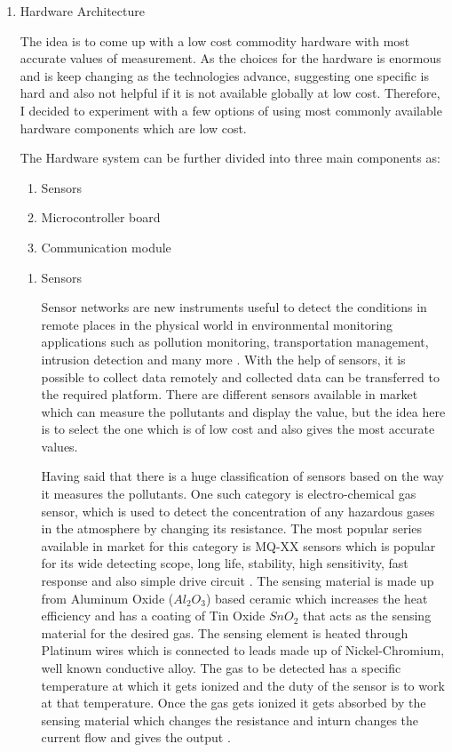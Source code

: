 \documentclass[11pt]{article}
\begin{document}
\begin{enumerate}

\item {Hardware Architecture}

The idea is to come up with a low cost commodity hardware with most accurate values of measurement. As the choices for the hardware is enormous and is keep changing as the technologies advance, suggesting one specific is hard and also not helpful if it is not available globally at low cost. Therefore, I decided to experiment with a few options of using most commonly available hardware components which are low cost. 

The Hardware system can be further divided into three main components as:
\begin{enumerate}
\item  Sensors
\item  Microcontroller board
\item  Communication module
\end{enumerate}


\begin{enumerate}
   \item Sensors
    
    Sensor networks are new instruments useful to detect the conditions in remote places in the physical world in environmental monitoring applications such as pollution monitoring, transportation management, intrusion detection and many more \cite{Jung2011}. With the help of sensors, it is possible to collect data remotely and collected data can be transferred to the required platform.
    There are different sensors available in market which can measure the pollutants and display the value, but the idea here is to select the one which is of low cost and also gives the most accurate values.

    Having said that there is a huge classification of sensors based on the way it measures the pollutants. One such category is electro-chemical gas sensor, which is used to detect the concentration of any hazardous gases in the atmosphere by changing its resistance. The most popular series available in market for this category is MQ-XX sensors which is popular for its wide detecting scope, long life, stability, high sensitivity, fast response and also simple drive circuit \cite{Data2012}. The sensing material is made up from Aluminum Oxide ($ Al_{2}O_{3}$) based ceramic which increases the heat efficiency and has a coating of Tin Oxide $ SnO_{2} $ that acts as the sensing material for the desired gas. The sensing element is heated through Platinum wires which is connected to leads made up of Nickel-Chromium, well known conductive alloy. The gas to be detected has a specific temperature at which it gets ionized and the duty of the sensor is to work at that temperature. Once the gas gets ionized it gets absorbed by the sensing material which changes the resistance and inturn changes the current flow and gives the output \cite{gassensor}.
    

\end{enumerate}
\end{enumerate}
\end{document}
